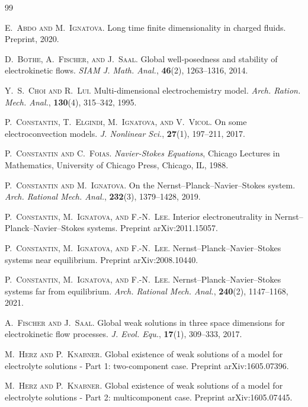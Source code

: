 \documentclass[10pt,twoside,reqno]{amsart}
\numberwithin{figure}{section}
\numberwithin{equation}{section}
\theoremstyle{definition}
\newcommand{\1}{\mathbbm{1}}
\begin{document}
\begin{thebibliography}{99}

 \textsc{E.~Abdo and M.~Ignatova}. Long time finite dimensionality in charged fluids. Preprint, 2020.

 \textsc{D.~Bothe, A.~Fischer, and J.~Saal}. Global well-posedness and stability of electrokinetic flows. {\it SIAM J. Math. Anal.}, {\bf 46}(2), 1263--1316, 2014.

 \textsc{Y.~S.~Choi and R.~Lui}. Multi-dimensional electrochemistry model. {\it Arch. Ration. Mech. Anal.}, {\bf 130}(4), 315--342, 1995.

 \textsc{P.~Constantin, T.~Elgindi, M.~Ignatova, and V.~Vicol}. On some electroconvection models. {\it J. Nonlinear Sci.}, {\bf 27}(1), 197--211, 2017.

 \textsc{P.~Constantin and C.~Foias}. {\it {N}avier-{S}tokes Equations}, Chicago Lectures in Mathematics, University of Chicago Press, Chicago, IL, 1988.

 \textsc{P.~Constantin and M.~Ignatova}. On the {N}ernst--{P}lanck--{N}avier--{S}tokes system. {\it Arch. Rational Mech. Anal.}, {\bf 232}(3), 1379--1428, 2019.

 \textsc{P.~Constantin, M.~Ignatova, and F.-N.~Lee}. Interior electroneutrality in {N}ernst--{P}lanck--{N}avier--{S}tokes systems. Preprint arXiv:2011.15057.

 \textsc{P.~Constantin, M.~Ignatova, and F.-N.~Lee}. {N}ernst--{P}lanck--{N}avier--{S}tokes systems near equilibrium. Preprint arXiv:2008.10440.

 \textsc{P.~Constantin, M.~Ignatova, and F.-N.~Lee}. {N}ernst--{P}lanck--{N}avier--{S}tokes systems far from equilibrium. {\it Arch. Rational Mech. Anal.}, {\bf 240}(2), 1147--1168, 2021.

 \textsc{A.~Fischer and J.~Saal}. Global weak solutions in three space dimensions for electrokinetic flow processes. {\it J. Evol. Equ.}, {\bf 17}(1), 309--333, 2017.

 \textsc{M.~Herz and P.~Knabner}. Global existence of weak solutions of a model for electrolyte solutions - Part 1: two-component case. Preprint arXiv:1605.07396.

 \textsc{M.~Herz and P.~Knabner}. Global existence of weak solutions of a model for electrolyte solutions - Part 2: multicomponent case. Preprint arXiv:1605.07445.


\end{thebibliography}
\end{document}
